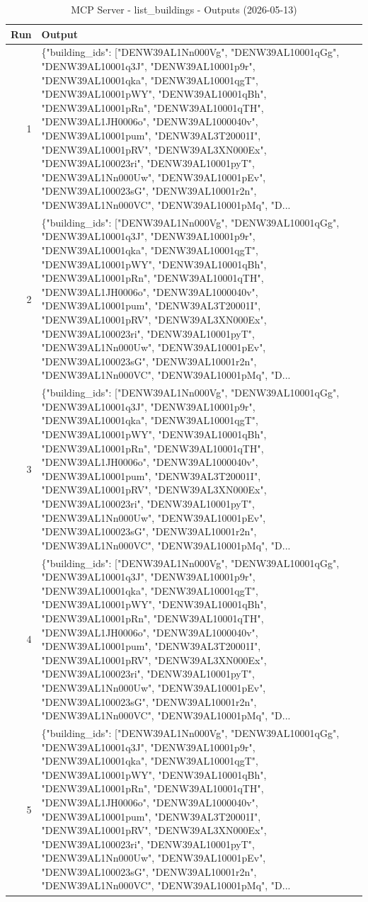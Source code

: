 \documentclass[a4paper,11pt]{article}
\begin{document}
\clearpage

\begin{table}[ht]
\centering
\scriptsize
\caption{MCP Server - list\_buildings - Outputs (2026-05-13)}
\label{tab:mcp\_list\_buildings\_outputs\_2026-05-13}
\begin{tabular}{r p{12cm}}
\hline
Run & Output \\
\hline
1 & \{"building\_ids": ["DENW39AL1Nn000Vg", "DENW39AL10001qGg", "DENW39AL10001q3J", "DENW39AL10001p9r", "DENW39AL10001qka", "DENW39AL10001qgT", "DENW39AL10001pWY", "DENW39AL10001qBh", "DENW39AL10001pRn", "DENW39AL10001qTH", "DENW39AL1JH0006o", "DENW39AL1000040v", "DENW39AL10001pum", "DENW39AL3T20001I", "DENW39AL10001pRV", "DENW39AL3XN000Ex", "DENW39AL100023ri", "DENW39AL10001pyT", "DENW39AL1Nn000Uw", "DENW39AL10001pEv", "DENW39AL100023sG", "DENW39AL10001r2n", "DENW39AL1Nn000VC", "DENW39AL10001pMq", "D... \\
2 & \{"building\_ids": ["DENW39AL1Nn000Vg", "DENW39AL10001qGg", "DENW39AL10001q3J", "DENW39AL10001p9r", "DENW39AL10001qka", "DENW39AL10001qgT", "DENW39AL10001pWY", "DENW39AL10001qBh", "DENW39AL10001pRn", "DENW39AL10001qTH", "DENW39AL1JH0006o", "DENW39AL1000040v", "DENW39AL10001pum", "DENW39AL3T20001I", "DENW39AL10001pRV", "DENW39AL3XN000Ex", "DENW39AL100023ri", "DENW39AL10001pyT", "DENW39AL1Nn000Uw", "DENW39AL10001pEv", "DENW39AL100023sG", "DENW39AL10001r2n", "DENW39AL1Nn000VC", "DENW39AL10001pMq", "D... \\
3 & \{"building\_ids": ["DENW39AL1Nn000Vg", "DENW39AL10001qGg", "DENW39AL10001q3J", "DENW39AL10001p9r", "DENW39AL10001qka", "DENW39AL10001qgT", "DENW39AL10001pWY", "DENW39AL10001qBh", "DENW39AL10001pRn", "DENW39AL10001qTH", "DENW39AL1JH0006o", "DENW39AL1000040v", "DENW39AL10001pum", "DENW39AL3T20001I", "DENW39AL10001pRV", "DENW39AL3XN000Ex", "DENW39AL100023ri", "DENW39AL10001pyT", "DENW39AL1Nn000Uw", "DENW39AL10001pEv", "DENW39AL100023sG", "DENW39AL10001r2n", "DENW39AL1Nn000VC", "DENW39AL10001pMq", "D... \\
4 & \{"building\_ids": ["DENW39AL1Nn000Vg", "DENW39AL10001qGg", "DENW39AL10001q3J", "DENW39AL10001p9r", "DENW39AL10001qka", "DENW39AL10001qgT", "DENW39AL10001pWY", "DENW39AL10001qBh", "DENW39AL10001pRn", "DENW39AL10001qTH", "DENW39AL1JH0006o", "DENW39AL1000040v", "DENW39AL10001pum", "DENW39AL3T20001I", "DENW39AL10001pRV", "DENW39AL3XN000Ex", "DENW39AL100023ri", "DENW39AL10001pyT", "DENW39AL1Nn000Uw", "DENW39AL10001pEv", "DENW39AL100023sG", "DENW39AL10001r2n", "DENW39AL1Nn000VC", "DENW39AL10001pMq", "D... \\
5 & \{"building\_ids": ["DENW39AL1Nn000Vg", "DENW39AL10001qGg", "DENW39AL10001q3J", "DENW39AL10001p9r", "DENW39AL10001qka", "DENW39AL10001qgT", "DENW39AL10001pWY", "DENW39AL10001qBh", "DENW39AL10001pRn", "DENW39AL10001qTH", "DENW39AL1JH0006o", "DENW39AL1000040v", "DENW39AL10001pum", "DENW39AL3T20001I", "DENW39AL10001pRV", "DENW39AL3XN000Ex", "DENW39AL100023ri", "DENW39AL10001pyT", "DENW39AL1Nn000Uw", "DENW39AL10001pEv", "DENW39AL100023sG", "DENW39AL10001r2n", "DENW39AL1Nn000VC", "DENW39AL10001pMq", "D... \\

\end{tabular}
\end{table}
\end{document}

